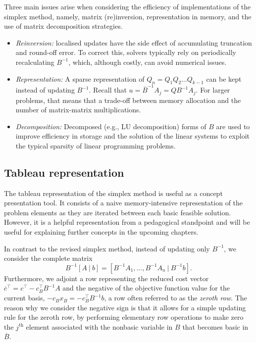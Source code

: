 Three main issues arise when considering the efficiency of implementations of the simplex method, namely, matrix (re)inversion, representation in memory, and the use of matrix decomposition strategies.
%
\begin{itemize}
	\item \emph{Reinversion:} localised updates have the side effect of accumulating truncation and round-off error. To correct this, solvers typically rely on periodically recalculating $B^{-1}$, which, although costly, can avoid numerical issues.
	\item \emph{Representation:} A sparse representation of $Q_n = Q_1Q_2 \dots Q_{k-1}$ can be kept instead of updating $B^{-1}$. Recall that $u = \overline{B}^{-1}A_j = QB^{-1}A_j$. For larger problems, that means that a trade-off between memory allocation and the number of matrix-matrix multiplications.
	\item \emph{Decomposition:} Decomposed (e.g., LU decomposition) forms of $B$ are used to improve efficiency in storage and the solution of the linear systems to exploit the typical sparsity of linear programming problems.  	
\end{itemize}



\subsection{Tableau representation}

The tableau representation of the simplex method is useful as a concept presentation tool. It consists of a naive memory-intensive representation of the problem elements as they are iterated between each basic feasible solution. However, it is a helpful representation from a pedagogical standpoint and will be useful for explaining further concepts in the upcoming chapters. 

In contrast to the revised simplex method, instead of updating only $B^{-1}$, we consider the complete matrix 
%
\begin{equation*}
	B^{-1}[A ~|~ b] = \left[B^{-1}A_1, \dots, B^{-1}A_n ~|~  B^{-1}b\right].		
\end{equation*}
%
Furthermore, we adjoint a row representing the reduced cost vector $\overline{c}^\top = c^\top - c_B^\top B^{-1}A$ and the negative of the objective function value for the current basis, $ -c_Bx_B = -c_B^\top B^{-1}b$, a row often referred to as the \emph{zeroth row}. The reason why we consider the negative sign is that it allows for a simple updating rule for the zeroth row, by performing elementary row operations to make zero the $j^\text{th}$ element associated with the nonbasic variable in $B$ that becomes basic in $\overline{B}$.

